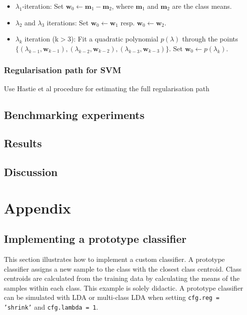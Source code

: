 \documentclass[utf8]{frontiersSCNS} %
\newcommand{\m}{\mathbf{m}}
\newcommand{\w}{\mathbf{w}}
\newcommand{\ttt}[1]{\texttt{#1}}
\begin{document}
\begin{itemize}
\item $\lambda_1$-iteration: Set $\w_0\leftarrow \m_1 - \m_2$, where $\m_1$ and $\m_2$ are the class means.
\item $\lambda_2$ and $\lambda_3$ iterations: Set $\w_0\leftarrow \w_1$ resp. $\w_0\leftarrow \w_2$.
\item $\lambda_k$ iteration (k$>$3): Fit a quadratic polynomial $p(\lambda)$ through the points $\{(\lambda_{k-1},\w_{k-1}), (\lambda_{k-2},\w_{k-2}), (\lambda_{k-3},\w_{k-3})\}$. Set $\w_0 \leftarrow p(\lambda_k)$.
\end{itemize}

\subsubsection{Regularisation path for SVM}
Use Hastie et al procedure for estimating the full regularisation path


\subsection{Benchmarking experiments}

\subsection{Results}

\subsection{Discussion}

\section{Appendix}

\subsection{Implementing a prototype classifier}

This section illustrates how to implement a custom classifier. A prototype classifier assigns a new sample to the class with the closest class centroid. Class centroids are calculated from the training data by calculating the means of the samples within each class. This example is solely didactic. A prototype classifier can be simulated with LDA or multi-class LDA when setting \ttt{cfg.reg = 'shrink'} and \ttt{cfg.lambda = 1}.
\end{document}
